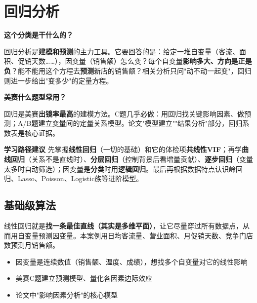 \chapter{回归分析}

\begin{chapteroverview}
\textbf{这个分类是干什么的？}

回归分析是\textbf{建模和预测}的主力工具。它要回答的是：给定一堆自变量（客流、面积、促销天数……），因变量（销售额）怎么变？每个自变量\textbf{影响多大、方向是正是负}？能不能用这个方程去\textbf{预测}新店的销售额？相关分析只问"动不动一起变"，回归则进一步给出"变多少"的定量方程。

\textbf{美赛什么题型常用？}

回归是美赛\textbf{出镜率最高}的建模方法。C题几乎必做：用回归找关键影响因素、做预测；A/B题建立变量间的定量关系模型。论文"模型建立""结果分析"部分，回归系数表是核心证据。

\textbf{学习路径建议}
先掌握\textbf{线性回归}（一切的基础）和它的体检项\textbf{共线性VIF}；再学\textbf{曲线回归}（关系不是直线时）、\textbf{分层回归}（控制背景后看增量贡献）、\textbf{逐步回归}（变量太多时自动筛选）；因变量是\textbf{分类}时用\textbf{逻辑回归}。最后再根据数据特点认识岭回归、Lasso、Poisson、Logistic族等进阶模型。
\end{chapteroverview}

\section{基础级算法}


\begin{algointro}
线性回归就是\textbf{找一条最佳直线（其实是多维平面）}，让它尽量穿过所有数据点，从而用自变量预测因变量。本案例用日均客流量、营业面积、月促销天数、竞争门店数预测月销售额。
\end{algointro}

\begin{algoscene}
\begin{itemize}
    \item 因变量是连续数值（销售额、温度、成绩），想找多个自变量对它的线性影响
    \item 美赛C题建立预测模型、量化各因素边际效应
    \item 论文中"影响因素分析"的核心模型
\end{itemize}
\end{algoscene}


